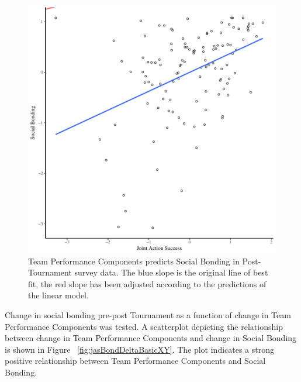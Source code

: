 \begin{CJK}{UTF8}{gbsn}
  \begin{figure}[htbp]
    \centering
  \includegraphics[scale=.5]{images/jasBondModelSlope.pdf}
    \caption{Team Performance Components predicts Social Bonding in Post-Tournament survey data. The blue slope is the original line of best fit, the red slope has been adjusted according to the predictions of the linear model.}
    \label{fig:jasBondModelSlope}
  \end{figure}








Change in social bonding pre-post Tournament as a function of change in Team Performance Components was tested. A scatterplot depicting the relationship between change in Team Performance Components and change in Social Bonding is shown in Figure ~\ref{fig:jasBondDeltaBasicXY}. The plot indicates a strong positive relationship between Team Performance Components and Social Bonding.


\end{CJK}
